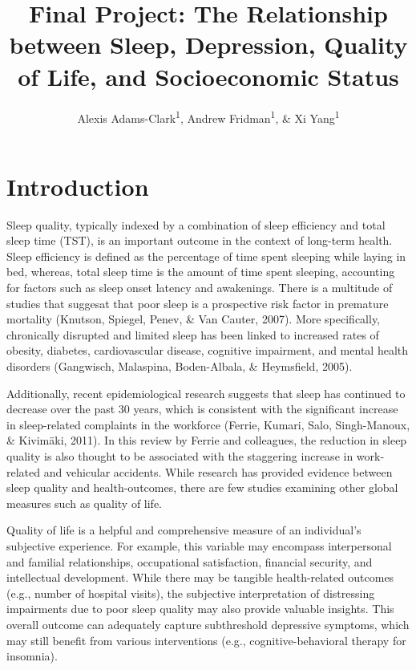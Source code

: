 \documentclass[man, noextraspace]{apa6}
\title{Final Project: The Relationship between Sleep, Depression, Quality of
Life, and Socioeconomic Status}
\author{Alexis Adams-Clark\textsuperscript{1}, Andrew
Fridman\textsuperscript{1}, \& Xi Yang\textsuperscript{1}}
\date{}
\affiliation{
\vspace{0.5cm}
\textsuperscript{1} University of Oregon Department of Psychology}
\theoremstyle{definition}
\theoremstyle{definition}
\theoremstyle{definition}
\theoremstyle{remark}
\begin{document}
\maketitle

\section{Introduction}\label{introduction}

Sleep quality, typically indexed by a combination of sleep efficiency
and total sleep time (TST), is an important outcome in the context of
long-term health. Sleep efficiency is defined as the percentage of time
spent sleeping while laying in bed, whereas, total sleep time is the
amount of time spent sleeping, accounting for factors such as sleep
onset latency and awakenings. There is a multitude of studies that
suggesat that poor sleep is a prospective risk factor in premature
mortality (Knutson, Spiegel, Penev, \& Van Cauter, 2007). More
specifically, chronically disrupted and limited sleep has been linked to
increased rates of obesity, diabetes, cardiovascular disease, cognitive
impairment, and mental health disorders (Gangwisch, Malaspina,
Boden-Albala, \& Heymsfield, 2005).

Additionally, recent epidemiological research suggests that sleep has
continued to decrease over the past 30 years, which is consistent with
the significant increase in sleep-related complaints in the workforce
(Ferrie, Kumari, Salo, Singh-Manoux, \& Kivimäki, 2011). In this review
by Ferrie and colleagues, the reduction in sleep quality is also thought
to be associated with the staggering increase in work-related and
vehicular accidents. While research has provided evidence between sleep
quality and health-outcomes, there are few studies examining other
global measures such as quality of life.

Quality of life is a helpful and comprehensive measure of an
individual's subjective experience. For example, this variable may
encompass interpersonal and familial relationships, occupational
satisfaction, financial security, and intellectual development. While
there may be tangible health-related outcomes (e.g., number of hospital
visits), the subjective interpretation of distressing impairments due to
poor sleep quality may also provide valuable insights. This overall
outcome can adequately capture subthreshold depressive symptoms, which
may still benefit from various interventions (e.g., cognitive-behavioral
therapy for insomnia).
\end{document}
